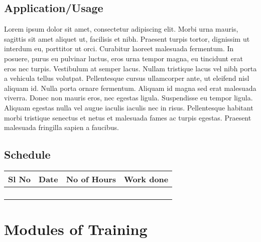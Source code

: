 \documentclass{fisattraining}
\begin{document}
\section{Application/Usage}
Lorem ipsum dolor sit amet, consectetur adipiscing elit. Morbi urna mauris, sagittis sit amet aliquet ut, facilisis et nibh. Praesent turpis tortor, dignissim ut interdum eu, porttitor ut orci. Curabitur laoreet malesuada fermentum. In posuere, purus eu pulvinar luctus, eros urna tempor magna, eu tincidunt erat eros nec turpis. Vestibulum at semper lacus. Nullam tristique lacus vel nibh porta a vehicula tellus volutpat. Pellentesque cursus ullamcorper ante, ut eleifend nisl aliquam id. Nulla porta ornare fermentum. Aliquam id magna sed erat malesuada viverra. Donec non mauris eros, nec egestas ligula. Suspendisse eu tempor ligula. Aliquam egestas nulla vel augue iaculis iaculis nec in risus. Pellentesque habitant morbi tristique senectus et netus et malesuada fames ac turpis egestas. Praesent malesuada fringilla sapien a faucibus.
\section{Schedule}

\begin{tabular}{|c|c|c|c|}
	\hline Sl No & Date  & No of Hours  & Work done  \\ 
	\hline  &  &  &  \\ 
	\hline  &  &  &  \\ 
	\hline  &  &  &  \\ 
	\hline  &  &  &  \\ 
	\hline 
\end{tabular} 

\chapter{Modules of Training}
\end{document}
